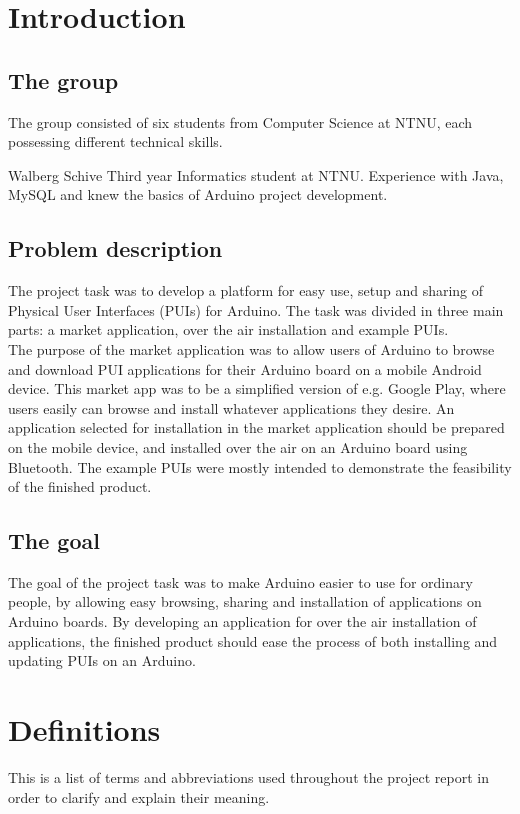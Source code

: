 \section{Introduction}
\subsection{The group}
The group consisted of six students from Computer Science at NTNU, each possessing different technical skills.

\item{\Wilhelm Walberg Schive}\newline %
	Third year Informatics student at NTNU. Experience with Java, MySQL and knew the basics of Arduino project development.


\subsection{Problem description}
The project task was to develop a platform for easy use, setup and sharing of Physical User Interfaces (PUIs) for Arduino. The task was divided in three main parts: a market application, over the air installation and example PUIs.\\
\newline
The purpose of the market application was to allow users of Arduino to browse and download PUI applications for their Arduino board on a mobile Android device. This market app was to be a simplified version of e.g. Google Play, where users easily can browse and install whatever applications they desire. An application selected for installation in the market application should be prepared on the mobile device, and installed over the air on an Arduino board using Bluetooth. The example PUIs were mostly intended to demonstrate the feasibility of the finished product.

\subsection{The goal}
The goal of the project task was to make Arduino easier to use for ordinary people, by allowing easy browsing, sharing and installation of applications on Arduino boards. By developing an application for over the air installation of applications, the finished product should ease the process of both installing and updating PUIs on an Arduino.

\section{Definitions}
This is a list of terms and abbreviations used throughout the project report in order to clarify and explain their meaning.


